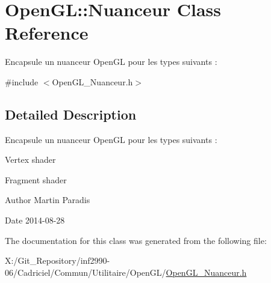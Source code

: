\hypertarget{class_open_g_l_1_1_nuanceur}{\section{Open\-G\-L\-:\-:Nuanceur Class Reference}
\label{class_open_g_l_1_1_nuanceur}
}


Encapsule un nuanceur Open\-G\-L pour les types suivants \-:  




{\ttfamily \#include $<$Open\-G\-L\-\_\-\-Nuanceur.\-h$>$}



\subsection{Detailed Description}
Encapsule un nuanceur Open\-G\-L pour les types suivants \-: 


\begin{DoxyItemize}
\item Vertex shader
\item Fragment shader
\end{DoxyItemize}

\begin{DoxyAuthor}{Author}
Martin Paradis 
\end{DoxyAuthor}
\begin{DoxyDate}{Date}
2014-\/08-\/28 
\end{DoxyDate}


The documentation for this class was generated from the following file\-:\begin{DoxyCompactItemize}
\item 
X\-:/\-Git\-\_\-\-Repository/inf2990-\/06/\-Cadriciel/\-Commun/\-Utilitaire/\-Open\-G\-L/\hyperlink{_open_g_l___nuanceur_8h}{Open\-G\-L\-\_\-\-Nuanceur.\-h}\end{DoxyCompactItemize}
